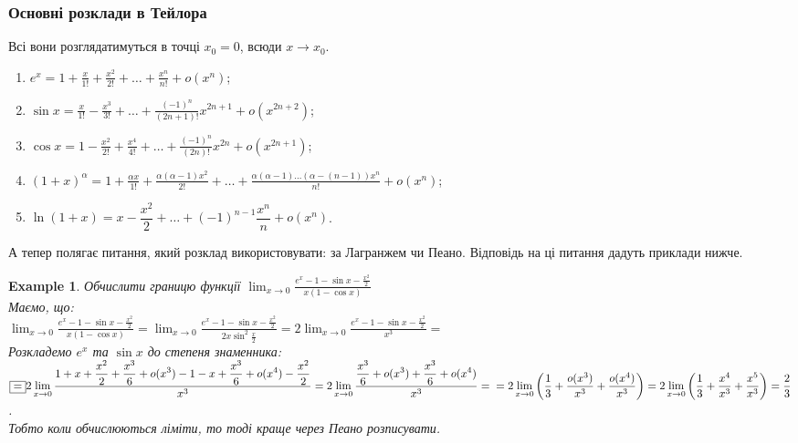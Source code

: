 \documentclass[a4paper, 14pt]{article}
\theoremstyle{theoremdd}
\theoremstyle{theoremdd}
\theoremstyle{theoremdd}
\theoremstyle{theoremdd}
\newtheorem{example}[theorem]{Example}
\theoremstyle{theoremdd}
\theoremstyle{theoremdd}
\theoremstyle{theoremdd}
\theoremstyle{theoremdd}
\begin{document}
\subsubsection*{Основні розклади в Тейлора}
Всі вони розглядатимуться в точці $x_0 = 0$, всюди $x \to x_0$.
\begin{enumerate}[nosep,wide=0pt,label={\Roman*.}]
\item $e^x \displaystyle = 1 + \frac{x}{1!} + \frac{x^2}{2!} + \dots + \frac{x^n}{n!} + o(x^n)$;
\item $\sin x \displaystyle = \frac{x}{1!} - \frac{x^3}{3!} + \dots + \frac{(-1)^n}{(2n+1)!}x^{2n+1} + o(x^{2n+2})$;
\item $\cos x \displaystyle = 1 - \frac{x^2}{2!} + \frac{x^4}{4!} + \dots + \frac{(-1)^n}{(2n)!}x^{2n} + o(x^{2n+1})$;
\item $(1+x)^{\alpha} \displaystyle = 1 + \frac{\alpha x}{1!} + \frac{\alpha (\alpha-1) x^2}{2!} + \dots + \frac{\alpha (\alpha-1)\dots(\alpha-(n-1)) x^n}{n!} + o(x^n)$;
\item $\ln(1+x) = x - \dfrac{x^2}{2} + \dots + (-1)^{n-1} \dfrac{x^n}{n} + o(x^n)$.
\end{enumerate}
А тепер полягає питання, який розклад використовувати: за Лагранжем чи Пеано. Відповідь на ці питання дадуть приклади нижче.
\begin{example}
Обчислити границю функції $\displaystyle \lim_{x \to 0} \frac{\displaystyle e^x-1-\sin x - \frac{x^2}{2}}{x(1-\cos x)}$\\
Маємо, що:\\
$\displaystyle \lim_{x \to 0} \frac{\displaystyle e^x-1-\sin x - \frac{x^2}{2}}{x(1-\cos x)} = \lim_{x \to 0} \frac{\displaystyle e^x - 1 - \sin x - \frac{x^2}{2}}{2x \sin^2 \frac{x}{2}} = 2\lim_{x \to 0} \frac{\displaystyle e^x - 1 - \sin x - \frac{x^2}{2}}{x^3} \boxed{=} $\\
Розкладемо $e^x$ та $\sin x$ до степеня знаменника:\\
$\boxed{=} \displaystyle 2\lim_{x \to 0} \frac{\displaystyle 1 + x + \frac{x^2}{2} + \frac{x^3}{6} + o(x^3) - 1 - x + \frac{x^3}{6} + o(x^4) - \frac{x^2}{2}}{x^3} = 2\lim_{x \to 0} \frac{\displaystyle \frac{x^3}{6} + o(x^3) + \frac{x^3}{6} + o(x^4)}{x^3} = \\ = 2 \lim_{x \to 0} \left(\frac{1}{3} + \frac{o(x^3)}{x^3} + \frac{o(x^4)}{x^3} \right) = 2 \lim_{x \to 0} \left(\frac{1}{3} + \frac{x^4}{x^3} + \frac{x^5}{x^3} \right) = \frac{2}{3}$.\\
\textit{Тобто коли обчислюються ліміти, то тоді краще через Пеано розписувати.}
\end{example}
\end{document}
